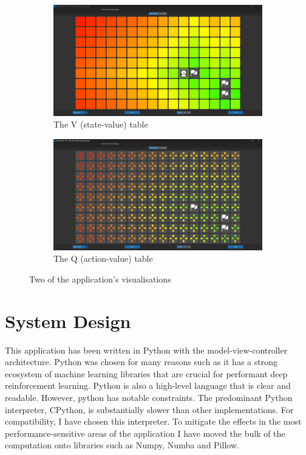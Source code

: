\documentclass[]{final_report}
\begin{document}
\begin{figure}[H]
  \centering
  \begin{subfigure}{.5\textwidth}
    \centering
    \includegraphics[width=0.95\linewidth]{state_value}
    \caption[width=0.5\linewidth]{\label{fig:screenshot:state-value-table} The V (state-value) table}
  \end{subfigure}%
  \begin{subfigure}{.5\textwidth}
    \centering
    \includegraphics[width=0.95\linewidth]{action_value}
    \caption[width=0.5\linewidth]{\label{fig:screenshot:action-value-table} The Q (action-value) table}
  \end{subfigure}
  \caption{Two of the application's visualisations}
  \label{fig:app-ui}
\end{figure}

\section{System Design}

This application has been written in Python with the model-view-controller architecture. Python was chosen for many reasons such as it has a strong ecosystem of machine learning libraries that are crucial for performant deep reinforcement learning. Python is also a high-level language that is clear and readable. However, python has notable constraints.  The predominant Python interpreter, CPython, is substantially slower than other implementations\cite{pythonMachineLearning}. For compatibility, I have chosen this interpreter. To mitigate the effects in the most performance-sensitive areas of the application I have moved the bulk of the computation onto libraries such as Numpy, Numba and Pillow. 
\end{document}
